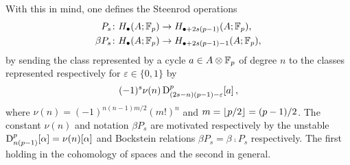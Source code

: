 With this in mind, one defines the Steenrod operations
\begin{align*}
	P_s \colon& H_\bullet(A; {\mathbb{F}_p}) \to H_{\bullet + 2s(p-1)}(A; {\mathbb{F}_p}), \\
	\beta P_s \colon& H_\bullet(A; {\mathbb{F}_p}) \to H_{\bullet + 2s(p-1) - 1}(A; {\mathbb{F}_p}),
\end{align*}
by sending the class represented by a cycle $a \in A \otimes {\mathbb{F}_p}$ of degree $n$ to the classes represented respectively for $\varepsilon \in \{0,1\}$ by
\begin{equation*}
	(-1)^s \nu(n) \, \mathrm{D}^p_{(2s-n)(p-1)-\varepsilon}[a] \,,
\end{equation*}
where $\nu(n) = (-1)^{n(n-1)m/2}(m!)^n$ and $m = \lfloor p/2\rfloor = (p-1)/2$.
The constant $\nu(n)$ and notation $\beta P_s$ are motivated respectively by the unstable $\mathrm{D}_{n(p-1)}^p[\alpha] = \nu(n)[\alpha]$ and Bockstein relations $\beta P_s = \beta \comp P_s$ respectively.
The first holding in the cohomology of spaces and the second in general.
